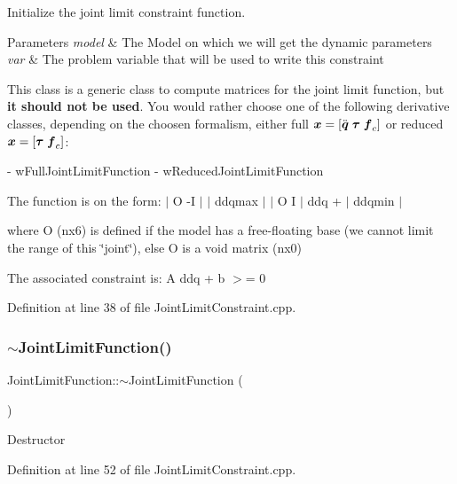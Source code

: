 Initialize the joint limit constraint function.


\begin{DoxyParams}{Parameters}
{\em model} & The Model on which we will get the dynamic parameters \\
\hline
{\em var} & The problem variable that will be used to write this constraint\\
\hline
\end{DoxyParams}
This class is a generic class to compute matrices for the joint limit function, but {\bfseries it should not be used}. You would rather choose one of the following derivative classes, depending on the choosen formalism, either full $ \mbox{\boldmath${x}$} = [ \ddot{\mbox{\boldmath${q}$}} \; \mbox{\boldmath${\tau}$} \; \mbox{\boldmath${f}$}_c ] $ or reduced $ \mbox{\boldmath${x}$} = [ \mbox{\boldmath${\tau}$} \; \mbox{\boldmath${f}$}_c ] $\+: \begin{DoxyVerb} - wFullJointLimitFunction
 - wReducedJointLimitFunction
\end{DoxyVerb}


The function is on the form\+: $\vert$ O -\/I $\vert$ $\vert$ ddqmax $\vert$ $\vert$ O I $\vert$ ddq + $\vert$ ddqmin $\vert$

where O (nx6) is defined if the model has a free-\/floating base (we cannot limit the range of this \char`\"{}joint\char`\"{}), else O is a void matrix (nx0)

The associated constraint is\+: A ddq + b $>$= 0 

Definition at line 38 of file Joint\+Limit\+Constraint.\+cpp.

\hypertarget{classocra_1_1JointLimitFunction_aa028e738a7dd0e89ef05628abf32d79f}{}\label{classocra_1_1JointLimitFunction_aa028e738a7dd0e89ef05628abf32d79f} 
\subsubsection{\texorpdfstring{$\sim$\+Joint\+Limit\+Function()}{~JointLimitFunction()}}
{\footnotesize\ttfamily Joint\+Limit\+Function\+::$\sim$\+Joint\+Limit\+Function (\begin{DoxyParamCaption}{ }\end{DoxyParamCaption})}

Destructor 

Definition at line 52 of file Joint\+Limit\+Constraint.\+cpp.



